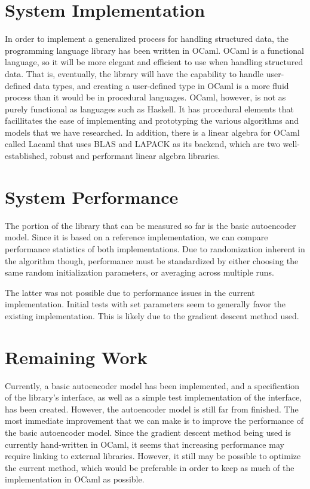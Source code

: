 \documentclass{sig-alternate}
\begin{document}
\section{System Implementation}
\label{sec:sysimp}

In order to implement a generalized process for handling structured data, the programming language 
library has been written in OCaml. OCaml is a functional language, so it will be more elegant and 
efficient to use when handling structured data. That is, eventually, the library will have the 
capability to handle user-defined data types, and creating a user-defined type in OCaml is a more
fluid process than it would be in procedural languages. OCaml, however, is not as purely functional 
as languages such as Haskell. It has procedural elements that facillitates the ease of implementing and prototyping the various algorithms and models that we have researched. In addition, there is a 
linear algebra for OCaml called Lacaml that uses BLAS and LAPACK as its backend, which are two
well-established, robust and performant linear algebra libraries.


\section{System Performance}
\label{sec:sysperformance}

The portion of the library that can be measured so far is the basic autoencoder model. 
Since it is based on a reference implementation, we can compare performance statistics of both
implementations. Due to randomization inherent in the algorithm though, performance must be
standardized by either choosing the same random initialization parameters, or averaging 
across multiple runs. 

The latter was not possible due to performance issues in the current implementation. Initial
tests with set parameters seem to generally favor the existing implementation. This is likely
due to the gradient descent method used. 


\section{Remaining Work}
\label{sec:project_proposal}

Currently, a basic autoencoder model has been implemented, and a specification of the library's
interface, as well as a simple test implementation of the interface, has been created. 
However, the autoencoder model is still far from finished. The most immediate improvement
that we can make is to improve the performance of the basic autoencoder model. Since the gradient
descent method being used is currently hand-written in OCaml, it seems that increasing 
performance may require linking to external libraries. However, it still may be possible to
optimize the current method, which would be preferable in order to keep as much of the 
implementation in OCaml as possible.
\end{document}
